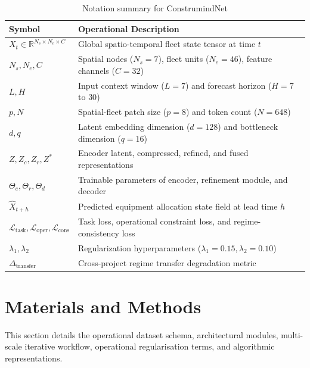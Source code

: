 \documentclass[11pt,a4paper]{article}
\begin{document}
\begin{table}[h]
\centering
\small
\caption{Notation summary for ConstrumindNet}\label{tab:notations}
\begin{tabular}{@{}ll@{}}
\toprule
\textbf{Symbol} & \textbf{Operational Description} \\
\midrule
$X_t \in \mathbb{R}^{N_s \times N_e \times C}$ & Global spatio-temporal fleet state tensor at time $t$ \\
$N_s, N_e, C$ & Spatial nodes ($N_s=7$), fleet units ($N_e=46$), feature channels ($C=32$) \\
$L, H$ & Input context window ($L=7$) and forecast horizon ($H=7$ to $30$) \\
$p, N$ & Spatial-fleet patch size ($p=8$) and token count ($N=648$) \\
$d, q$ & Latent embedding dimension ($d=128$) and bottleneck dimension ($q=16$) \\
$Z, Z_c, Z_r, Z^*$ & Encoder latent, compressed, refined, and fused representations \\
$\Theta_e, \Theta_r, \Theta_d$ & Trainable parameters of encoder, refinement module, and decoder \\
$\widehat{X}_{t+h}$ & Predicted equipment allocation state field at lead time $h$ \\
$\mathcal{L}_{\text{task}}, \mathcal{L}_{\text{oper}}, \mathcal{L}_{\text{cons}}$ & Task loss, operational constraint loss, and regime-consistency loss \\
$\lambda_1, \lambda_2$ & Regularization hyperparameters ($\lambda_1 = 0.15, \lambda_2 = 0.10$) \\
$\Delta_{\text{transfer}}$ & Cross-project regime transfer degradation metric \\
\bottomrule
\end{tabular}
\end{table}

\section{Materials and Methods}\label{sec:methods}
This section details the operational dataset schema, architectural modules, multi-scale iterative workflow, operational regularisation terms, and algorithmic representations.
\end{document}
